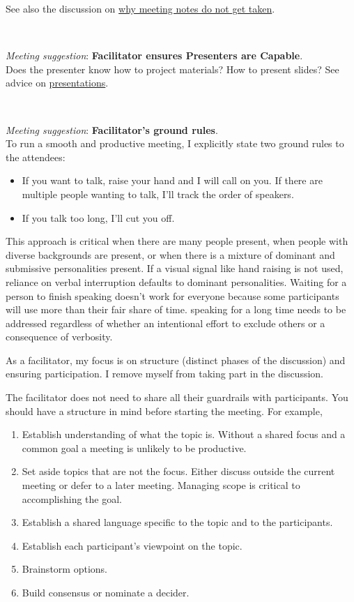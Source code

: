 See also the discussion on \hyperref[sec:written-comm-does-not-happen]{why meeting notes do not get taken}.

\ \\
\begin{samepage}
\textit{Meeting suggestion}: \textbf{Facilitator ensures Presenters are Capable}.\\
Does the presenter know how to project materials? How to present slides?
See advice on \hyperref[sec:bad-presentations]{presentations}.
\end{samepage}

\ \\
\begin{samepage}
\textit{Meeting suggestion}: \textbf{Facilitator's ground rules}.\\
To run a smooth and productive meeting, I explicitly state two ground rules to the attendees:
\end{samepage}
\begin{itemize}
    \item If you want to talk, raise your hand and I will call on you. If there are multiple people wanting to talk, I'll track the order of speakers.
    \item If you talk too long, I'll cut you off. 
\end{itemize}
This approach is critical when there are many people present, when people with diverse backgrounds are present, or when there is a mixture of dominant and submissive personalities present. 
If a visual signal like hand raising is not used, reliance on verbal interruption defaults to dominant personalities. Waiting for a person to finish speaking doesn't work for everyone because some participants will use more than their fair share of time. speaking for a long time needs to be addressed regardless of whether an intentional effort to exclude others or a consequence of verbosity.

As a facilitator, my focus is on structure (distinct phases of the discussion) and ensuring participation. I remove myself from taking part in the discussion.

The facilitator does not need to share all their guardrails with participants. You should have a structure in mind before starting the meeting. For example,
\begin{enumerate}
    \item Establish understanding of what the topic is. Without a shared focus and a common goal a meeting is unlikely to be productive. 
    \item Set aside topics that are not the focus. Either discuss outside the current meeting or defer to a later meeting. Managing scope is critical to accomplishing the goal. 
    \item Establish a shared language specific to the topic and to the participants.
    \item Establish each participant's viewpoint on the topic.
    \item Brainstorm options.
    \item Build consensus or nominate a decider.
\end{enumerate}


